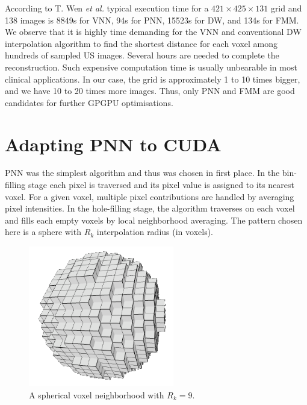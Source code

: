 \documentclass[12pt,journal,compsoc]{IEEEtran}
\begin{document}
According to T. Wen \textit{et al.}\cite{2} typical execution time for a $421\times425\times131$ grid and 138 images is 8849s for VNN, 94s for PNN, 15523s for DW, and 134s for FMM.
We observe that it is highly time demanding for the VNN and conventional DW interpolation algorithm to find the shortest distance for each voxel among hundreds of sampled US images. Several hours are needed to complete the reconstruction. Such expensive computation time is usually unbearable in most clinical applications. In our case, the grid is approximately 1 to 10 times bigger, and we have 10 to 20 times more images. Thus, only PNN and FMM are good candidates for further GPGPU optimisations.

\section{Adapting PNN to CUDA}

PNN was the simplest algorithm and thus was chosen in first place. 
In the bin-filling stage each pixel is traversed and its pixel value is assigned to its nearest voxel. 
For a given voxel, multiple pixel contributions are handled by averaging pixel intensities.  
In the hole-filling stage, the algorithm traverses on each voxel and fills each empty voxels by local neighborhood averaging. The pattern chosen here is a sphere with $R_k$ interpolation radius (in voxels). 


\begin{figure}[ht!]
\centering
\includegraphics[width=2.5in]{neighborhood}
\caption{A spherical voxel neighborhood with $R_k=9$.}
\label{neighborhood}
\end{figure}
\end{document}
